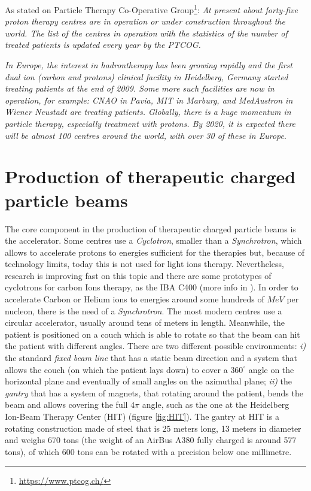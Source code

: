 \documentclass[12pt, a4paper, twoside]{book}
\begin{document}
As stated on Particle Therapy Co-Operative Group\footnote{\url{https://www.ptcog.ch/}}: \emph{At present about forty-five proton therapy centres are in operation or under construction throughout the world. The list of the centres in operation with the statistics of the number of treated patients is updated every year by the PTCOG.}

\emph{In Europe, the interest in hadrontherapy has been growing rapidly and the first dual ion (carbon and protons) clinical facility in Heidelberg, Germany started treating patients at the end of 2009. Some more such facilities are now in operation, for example: CNAO in Pavia, MIT in Marburg, and MedAustron in Wiener Neustadt are treating patients.
Globally, there is a huge momentum in particle therapy, especially treatment with protons. By 2020, it is expected there will be almost 100 centres around the world, with over 30 of these in Europe}.


\section{Production of therapeutic charged particle beams}
The core component in the production of therapeutic charged particle beams is the accelerator. Some centres use a \emph{Cyclotron}, smaller than a \emph{Synchrotron}, which allows to accelerate protons to energies sufficient for the therapies but, because of technology limits, today this is not used for light ions therapy. Nevertheless, research is improving fast on this topic and there are some prototypes of cyclotrons for carbon Ions therapy, as the IBA C400 (more info in \cite{jong:iba}). In order to accelerate Carbon or Helium ions to energies around some hundreds of $MeV$ per nucleon, there is the need of a \emph{Synchrotron}. The most modern centres use a circular accelerator, usually around tens of meters in length. Meanwhile, the patient is positioned on a couch which is able to rotate so that the beam can hit the patient with different angles. There are two different possible environments: \emph{i)} the standard \emph{fixed beam line} that has a static beam direction and a system that allows the couch (on which the patient lays down) to cover a $360^\circ$ angle on the horizontal plane and eventually of small angles on the azimuthal plane; \emph{ii)} the \emph{gantry} that has a system of magnets, that rotating around the patient, bends the beam and allows covering the full $4\pi$ angle, such as the one at the Heidelberg Ion-Beam Therapy Center (HIT) (figure \ref{fig:HIT}). The gantry at HIT is a rotating construction made of steel that is 25 meters long, 13 meters in diameter and weighs 670 tons (the weight of an AirBus A380 fully charged is around 577 tons), of which 600 tons can be rotated with a precision below one millimetre. 
\end{document}
